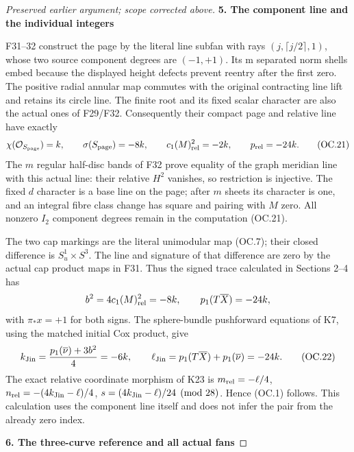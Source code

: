 \begin{proof}[Preserved earlier argument; scope corrected above]
\par

\medskip\noindent\textbf{5. The component line and the individual integers}

\par\nobreak

F31--32 construct the page by the literal line subfan with rays
\((j,\lceil j/2\rceil,1)\), whose two source component degrees are \((-1,+1)\).
Its m separated norm shells embed because the displayed height
defects prevent reentry after the first zero. The positive radial
annular map commutes with the original contracting line lift and
retains its circle line. The finite root and its fixed scalar
character are also the actual ones of F29/F32. Consequently their
compact page and relative line have exactly
\[
 \chi(\mathcal O_{S_{\rm page}})=k,\qquad
 \sigma(S_{\rm page})=-8k,\qquad
 c_1(M)_{\rm rel}^2=-2k,
 \qquad p_{\rm rel}=-24k.
 \tag{OC.21}
\]
The \(m\) regular half-disc bands of F32 prove equality of the graph
meridian line with this actual line: their relative \(H^2\) vanishes, so
restriction is injective. The fixed \(d\) character is a base line on
the page; after \(m\) sheets its character is one, and an integral fibre
class change has square and pairing with \(M\) zero. All nonzero \(I_2\)
component degrees remain in the computation (OC.21).

The two cap markings are the literal unimodular map (OC.7); their
closed difference is \(S^1_u\times S^3\). The line and signature of that
difference are zero by the actual cap product maps in F31. Thus
the signed trace calculated in Sections 2--4 has
\[
 b^2=4c_1(M)_{\rm rel}^2=-8k,\qquad
 p_1(T\overline X)=-24k,
\]
with \(\pi_*x=+1\) for both signs. The sphere-bundle pushforward equations
of K7, using the matched initial Cox product, give
\[
 k_{\rm Jin}=\frac{p_1(\overline\nu)+3b^2}{4}=-6k,
 \qquad
 \ell_{\rm Jin}=p_1(T\overline X)+p_1(\overline\nu)=-24k.
 \tag{OC.22}
\]
The exact relative coordinate morphism of K23 is
\(m_{\rm rel}=-\ell/4\), \(n_{\rm rel}=-(4k_{\rm Jin}-\ell)/4\),
\(s=(4k_{\rm Jin}-\ell)/24\pmod{28}\). Hence (OC.1) follows. This calculation
uses the component line itself and does not infer the pair from the
already zero index.

\par

\medskip\noindent\textbf{6. The three-curve reference and all actual fans}

\par\nobreak


\end{proof}
